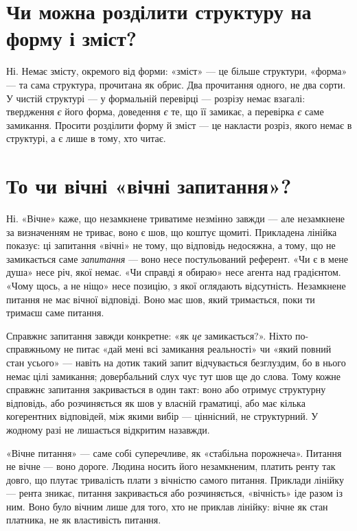 \documentclass[12pt, a4paper, openany]{book}
\begin{document}
\section{Чи можна розділити структуру на форму і зміст?}

Ні. Немає змісту, окремого від форми: «зміст» --- це більше структури, «форма» --- та сама структура, прочитана як обрис. Два прочитання одного, не два сорти. У чистій структурі --- у формальній перевірці --- розрізу немає взагалі: твердження \emph{є} його форма, доведення \emph{є} те, що її замикає, а перевірка \emph{є} саме замикання. Просити розділити форму й зміст --- це накласти розріз, якого немає в структурі, а є лише в тому, хто читає.

\section{То чи вічні «вічні запитання»?}

Ні. «Вічне» каже, що незамкнене триватиме незмінно завжди --- але незамкнене за визначенням не триває, воно є шов, що коштує щомиті. Прикладена лінійка показує: ці запитання «вічні» не тому, що відповідь недосяжна, а тому, що не замикається саме \emph{запитання} --- воно несе постульований референт. «Чи є в мене душа» несе річ, якої немає. «Чи справді я обираю» несе агента над градієнтом. «Чому щось, а не ніщо» несе позицію, з якої оглядають відсутність. Незамкнене питання не має вічної відповіді. Воно має шов, який тримається, поки ти тримаєш саме питання.

Справжнє запитання завжди конкретне: «як \emph{це} замикається?». Ніхто по-справжньому не питає «дай мені всі замикання реальності» чи «який повний стан усього» --- навіть на дотик такий запит відчувається безглуздим, бо в нього немає цілі замикання; довербальний слух чує тут шов ще до слова. Тому кожне справжнє запитання закривається в один такт: воно або отримує структурну відповідь, або розчиняється як шов у власній граматиці, або має кілька когерентних відповідей, між якими вибір --- ціннісний, не структурний. У жодному разі не лишається відкритим назавжди.

«Вічне питання» --- саме собі суперечливе, як «стабільна порожнеча». Питання не вічне --- воно дороге. Людина носить його незамкненим, платить ренту так довго, що плутає тривалість плати з вічністю самого питання. Приклади лінійку --- рента зникає, питання закривається або розчиняється, «вічність» іде разом із ним. Воно було вічним лише для того, хто не приклав лінійку: вічне як стан платника, не як властивість питання.
\end{document}
